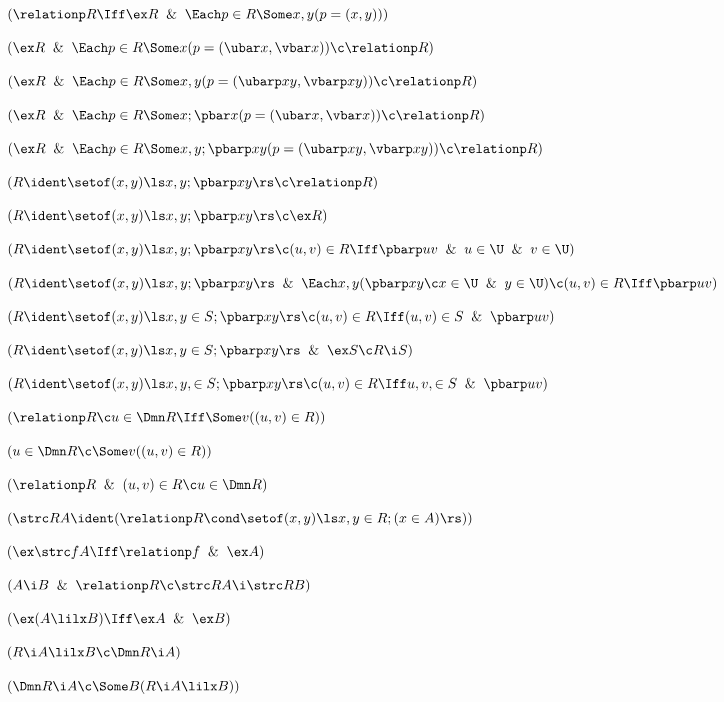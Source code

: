  $(\relationp R\Iff \ex R \And \Each p \in R \Some x,y (p = (x,y)))$

 $(\ex R \And \Each p \in R\Some x (p = (\ubar x,\vbar x)) \c \relationp R)$

 $(\ex R \And \Each p \in R\Some x,y (p = (\ubarp xy,\vbarp xy)) \c \relationp R)$

 $(\ex R \And \Each p \in R\Some x ;\pbar x(p = (\ubar x,\vbar x)) \c \relationp R)$

 $(\ex R \And\Each p \in R\Some x,y;\pbarp xy (p = (\ubarp xy,\vbarp xy)) \c \relationp R)$

 $(R \ident \setof (x,y) \ls x,y;\pbarp xy\rs \c \relationp R)$
 
 $(R \ident \setof (x,y) \ls x,y;\pbarp xy\rs \c \ex R)$
 
 $(R \ident \setof (x,y) \ls x,y;\pbarp xy\rs \c (u,v) \in R \Iff \pbarp uv \And u \in \U \And v \in \U)$

 $(R \ident \setof (x,y) \ls x,y;\pbarp xy\rs \And \Each x,y(\pbarp xy \c x \in \U \And y \in \U) \c (u,v) \in R \Iff \pbarp uv)$

 $(R \ident \setof (x,y) \ls x,y \in S ;\pbarp xy\rs \c (u,v) \in R \Iff (u,v) \in S \And \pbarp uv)$

 $(R \ident \setof (x,y) \ls x,y \in S ;\pbarp xy\rs \And \ex S\c R \i S)$ 

 $(R \ident \setof (x,y) \ls x,y,\in S ;\pbarp xy\rs \c (u,v) \in R \Iff u,v, \in S \And \pbarp uv)$

 $(\relationp R \c u \in \Dmn R \Iff \Some v ((u,v) \in R)) $

 $(u \in \Dmn R \c \Some v ((u,v) \in R)) $

 $(\relationp R \And (u,v) \in R \c u \in \Dmn R) $

 $(\strc RA \ident(\relationp R \cond \setof (x,y)\ls x,y\in R;(x \in A)\rs))$

 $(\ex \strc fA \Iff \relationp f \And \ex A)$

 $(A \i B \And \relationp R \c \strc R A \i \strc R B)$

 $(\ex (A \lilx B) \Iff \ex A \And \ex B)$ 

 $(R \i A \lilx B \c \Dmn R \i A)$

 $(\Dmn R \i A \c \Some B (R \i A \lilx B))$

